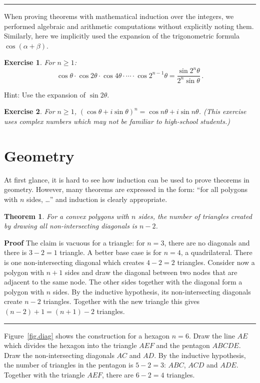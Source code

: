 \documentclass[11pt,a4paper]{report}
\newcommand*{\qed}{\hfill\rule{1ex}{1.5ex}}
\newcommand*{\qedd}[1]{\vspace*{-#1ex}\qed}
\newtheorem{theorem}{Theorem}
\newtheorem{exercise}{Exercise}
\begin{document}
\qedd{5}

When proving theorems with mathematical induction over the integers, we performed algebraic and arithmetic computations without explicitly noting them. Similarly, here we implicitly used the expansion of the trigonometric formula $\cos (\alpha+\beta)$.

\begin{exercise}
For $n\geq 1$:
\[
\cos\theta \cdot \cos 2\theta \cdot \cos 4\theta \cdot \cdots \cdot \cos 2^{n-1}\theta = \frac{\sin 2^n\theta}{2^n \sin \theta}\,.
\]
\end{exercise}
Hint: Use the expansion of $\sin 2\theta$.

\begin{exercise}
For $n\geq 1$, $(\cos \theta + i\sin\theta)^n = \cos n\theta + i\sin n\theta$. (This exercise uses complex numbers which may not be familiar to high-school students.)
\end{exercise}

\section{Geometry}

At first glance, it is hard to see how induction can be used to prove theorems in geometry. However, many theorems are expressed in the form: ``for all polygons with $n$ sides, \ldots'' and induction is clearly appropriate.

\begin{theorem}\label{t.diag}
For a convex polygons with $n$ sides, the number of triangles created by drawing all \emph{non-intersecting} diagonals is $n-2$.
\end{theorem}

\textbf{Proof} The claim is vacuous for a triangle: for $n=3$, there are no diagonals and there is $3-2=1$ triangle. A better base case is for $n=4$, a quadrilateral. There is one non-intersecting diagonal which creates $4-2=2$ triangles. Consider now a polygon with $n+1$ sides and draw the diagonal between two nodes that are adjacent to the same node. The other sides together with the diagonal form a polygon with $n$ sides. By the inductive hypothesis, its non-intersecting diagonals create $n-2$ triangles. Together with the new triangle this gives $(n-2)+1=(n+1)-2$ triangles.\qed

Figure~\ref{fig.diag} shows the construction for a hexagon $n=6$. Draw the line $AE$ which divides the hexagon into the triangle $AEF$ and the pentagon $ABCDE$. Draw the non-intersecting diagonals $AC$ and $AD$. By the inductive hypothesis, the number of triangles in the pentagon is $5-2=3$: $ABC$, $ACD$ and $ADE$. Together with the triangle $AEF$, there are $6-2=4$ triangles.
\end{document}
